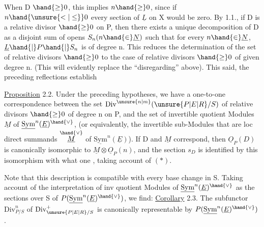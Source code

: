 
When D $\hand{\geq} 0$, this implies $n \hand{\geq} 0$, since if  $n \hand{\unsure{<|\leq}} 0$ every section of
$\underline{L}$ on X would be zero. By 1.1., if D is a relative divisor
$\hand{\geq} 0$ on P, then there exists a unique decomposition of D as a disjoint
sum of opens $S_n (n \hand{\in} \underline{N})$ such that for every $n \hand{\in} \underline{N}$, $\underline{L}\hand{|}P\hand{|}S_n$ is of
degree n. This reduces the determination of the set of relative divisors
$\hand{\geq} 0$ to the case of relative divisors $\hand{\geq} 0$ of given degree n. (This
  will evidently replace the ``disregarding'' above). This said,
the preceding reflections establish

\uline{Proposition} 2.2. Under the preceding hypotheses, we have a one-to-one
correspondence between the set $\mathrm{Div}^{\unsure{n|m}}(\unsure{P|E|R}/S)$ of relative divisors $\hand{\geq} 0$ of
degree n on P, and the set of invertible quotient Modules $\underline{M}$ of
$\underline{\mathrm{Sym}}^{n}(\underline{E})^{\hand{\vee}}$, (or equivalently, the invertible sub-Modules that are loc
direct summands $\overset{\hand{\vee}}{\underline{M}}$ of $\underline{\mathrm{Sym}}^{n}(\underline{E})$). If D and $\underline{M}$ correspond, then
$\underline{O}_P(D)$ is canonically isomorphic to $\underline{M}\otimes\underline{O}_P(n)$, and the section $s_D$ is
identified by this isomorphism with what one , taking account of $(*)$.

Note that this description is compatible with every base
change in S. Taking account of the interpretation of inv quotient Modules of
$\underline{\mathrm{Sym}}^{n}(\underline{E})^{\hand{\vee}}$ as the sections over S of $P(\underline{\mathrm{Sym}}^{n}(\underline{E})^{\hand{\vee}})$, we find:
\uline{Corollary} 2.3. The subfunctor  $\mathrm{Div}^{n}_{P/S}$ of $\mathrm{Div}^{+}_{\unsure{P|E|R}/S}$ is canonically representable
by $P(\underline{\mathrm{Sym}}^{n}(\underline{E})^{\hand{\vee}})$.


